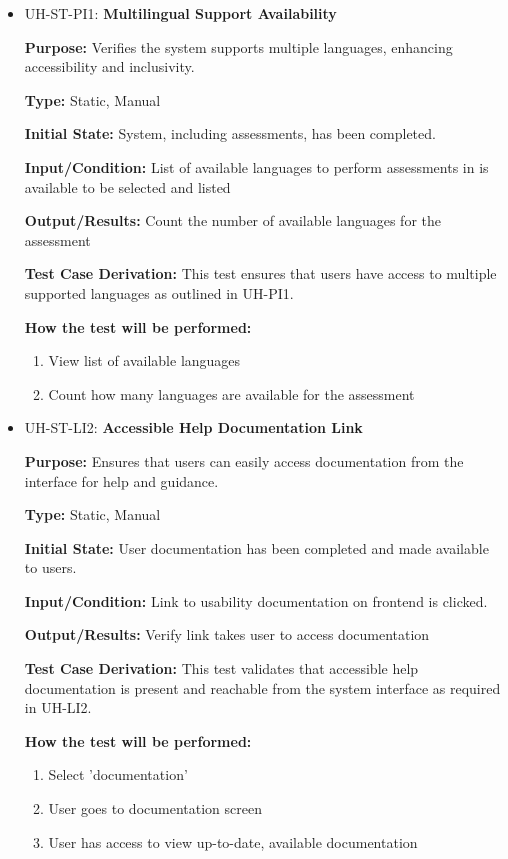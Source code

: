 \documentclass[12pt, titlepage]{article}
\begin{document}
\begin{itemize}
  \item UH-ST-PI1: \textbf{Multilingual Support Availability}
  \begin{mdframed}[linewidth=0.5mm]
      \textbf{Purpose:} Verifies the system supports multiple languages, enhancing accessibility and inclusivity. \par
      \textbf{Type:} Static, Manual \par
      \textbf{Initial State:} System, including assessments, has been completed. \par
      \textbf{Input/Condition:} List of available languages to perform assessments in is available to be selected and listed \par
      \textbf{Output/Results:} Count the number of available languages for the assessment \par
      \textbf{Test Case Derivation:} This test ensures that users have access to multiple supported languages as outlined in UH-PI1. \par
      \textbf{How the test will be performed:}
      \begin{enumerate}[noitemsep]
        \item View list of available languages
        \item Count how many languages are available for the assessment
      \end{enumerate}
  \end{mdframed}

  \item UH-ST-LI2: \textbf{Accessible Help Documentation Link}
  \begin{mdframed}[linewidth=0.5mm]
      \textbf{Purpose:} Ensures that users can easily access documentation from the interface for help and guidance. \par
      \textbf{Type:} Static, Manual \par
      \textbf{Initial State:} User documentation has been completed and made available to users. \par
      \textbf{Input/Condition:} Link to usability documentation on frontend is clicked. \par
      \textbf{Output/Results:} Verify link takes user to access documentation \par
      \textbf{Test Case Derivation:} This test validates that accessible help documentation is present and reachable from the system interface as required in UH-LI2. \par
      \textbf{How the test will be performed:}
      \begin{enumerate}[noitemsep]
        \item Select 'documentation'
        \item User goes to documentation screen
        \item User has access to view up-to-date, available documentation
      \end{enumerate}
  \end{mdframed}
\end{itemize}
\end{document}
